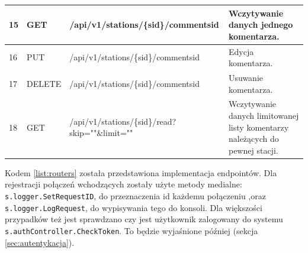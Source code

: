\begin{table}[htb]
\begin{tabularx}{\linewidth}{| m{0.45cm} | m{1.5cm} | m{6cm} | X |}
    \hline
    15 & GET & /api/v1/stations/\{sid\}/comments{id} & Wczytywanie danych jednego komentarza. \\
    \hline
    16 & PUT & /api/v1/stations/\{sid\}/comments{id} & Edycja komentarza. \\
    \hline
    17 & DELETE & /api/v1/stations/\{sid\}/comments{id} & Usuwanie komentarza. \\
    \hline
    18 & GET & /api/v1/stations/\{sid\}/read?skip=""\&limit="" & Wczytywanie danych limitowanej listy komentarzy należących do pewnej stacji. \\
    \hline
    \end{tabularx}
\end{table}

Kodem \ref{list:routers} została przedstawiona implementacja endpointów.
Dla rejestracji połączeń wchodzących zostały użyte metody medialne: \texttt{s.logger.SetRequestID}, do przeznaczenia id każdemu połączeniu ,oraz \texttt{s.logger.LogRequest}, do wypisywania tego do konsoli.
Dla większości przypadków też jest sprawdzano czy jest użytkownik zalogowany do systemu \texttt{s.authController.CheckToken}. To będzie wyjaśnione później (sekcja \ref{sec:autentykacja}).
